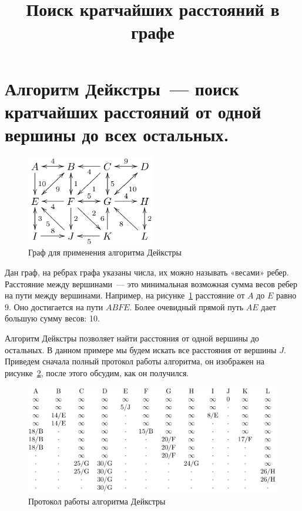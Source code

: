 \documentclass{article}
\title{Поиск кратчайших расстояний в графе}
\author{}
\date{}
\begin{document}
\maketitle

\section{Алгоритм Дейкстры~--- поиск кратчайших расстояний от одной вершины до всех остальных.}

\begin{figure}
\begin{center}
\includegraphics[width=0.5\textwidth]{dijkstra-statement.png}
\end{center}
\caption{Граф для применения алгоритма Дейкстры}
\label{fig:dijkstra-statement}
\end{figure}

Дан граф, на ребрах графа указаны числа, их можно называть «весами» ребер. Расстояние между вершинами~--- это минимальная возможная сумма весов ребер на пути между вершинами. Например, на рисунке~\ref{fig:dijkstra-statement} расстояние от $A$ до $E$ равно 9. Оно достигается на пути $ABFE$. Более очевидный прямой путь $AE$ дает большую сумму весов: 10.

Алгоритм Дейкстры позволяет найти расстояния от одной вершины до остальных. В данном примере мы будем искать все расстояния от вершины $J$. Приведем сначала полный протокол работы алгоритма, он изображен на рисунке~\ref{fig:dijkstra-answer}, после этого обсудим, как он получился.

\begin{figure}
\begin{center}
	\includegraphics[width=\textwidth]{dijkstra-answer.png}
\end{center}
\caption{Протокол работы алгоритма Дейкстры}
\label{fig:dijkstra-answer}
\end{figure}
\end{document}
